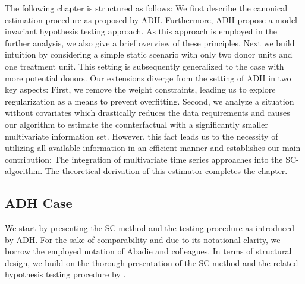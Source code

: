 The following chapter is structured as follows: We first describe the canonical estimation procedure as proposed by \ac{ADH}. Furthermore, \ac{ADH} propose a model-invariant hypothesis testing approach. As this approach is employed in the further analysis, we also give a brief overview of these principles. Next we build intuition by considering a simple static scenario with only two donor units and one treatment unit. This setting is subsequently generalized to the case with more potential donors. Our extensions diverge from the setting of \ac{ADH} in two key aspects: First, we remove the weight constraints, leading us to explore regularization as a means to prevent overfitting. Second, we analyze a situation without covariates which drastically reduces the data requirements and causes our algorithm to estimate the counterfactual with a significantly smaller multivariate information set. However, this fact leads us to the necessity of utilizing all available information in an efficient manner and establishes our main contribution: The integration of  multivariate time series approaches into the \ac{SC}-algorithm. The theoretical derivation of this estimator completes the chapter.

\subsection{ADH Case}
\label{ADH Case}
We start by presenting the \ac{SC}-method and the testing procedure as introduced by \ac{ADH}. For the sake of comparability and due to its notational clarity, we borrow the employed notation of Abadie and colleagues. In terms of structural design, we build on the thorough presentation of the \ac{SC}-method and the related hypothesis testing procedure by \cite{firpo:2018}.

